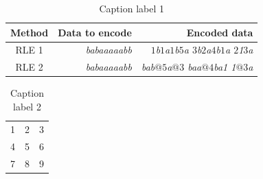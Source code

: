 \begin{table}
   \centering
   \begin{tabular}{|c|r|r|}
      \hline \textbf{Method} & \textbf{Data to encode} & \textbf{Encoded data}                               \\\hline
      RLE 1                  & \textit{babaaaaabb}     & \textit{$1$b$1$a$1$b$5$a $3$b$2$a$4$b$1$a $2$1$3$a} \\\hline
      RLE 2                  & \textit{babaaaaabb}     & \textit{bab$@5$a$@3$ baa$@4$ba1 1$@3$a}             \\\hline
   \end{tabular}
   \caption[List label 1]{Caption label 1}\label{tab:example1}
\end{table}

\begin{table}
   \centering
   \begin{tabular}{| l | c r |}
      \hline
      1 & 2 & 3 \\
      4 & 5 & 6 \\
      7 & 8 & 9 \\
      \hline
   \end{tabular}
   \caption[List label 2]{Caption label 2}\label{tab:example2}
\end{table}



